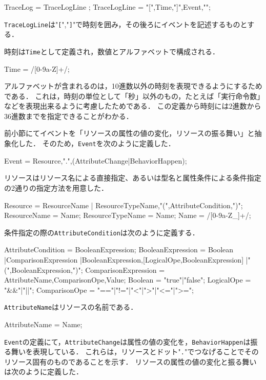 \begin{EBNF}
TraceLog = { TraceLogLine };
TraceLogLine = "[",Time,"]",Event,"\n";
\end{EBNF}

\verb|TraceLogLine|は"\verb|[|","\verb|]|"で時刻を囲み，その後ろにイベントを記述するものとする．

時刻は\verb|Time|として定義され，数値とアルファベットで構成される．

\begin{EBNF}
Time = /[0-9a-Z]+/;
\end{EBNF}

アルファベットが含まれるのは，10進数以外の時刻を表現できるようにするためである．
これは，時刻の単位として「秒」以外のもの，たとえば「実行命令数」などを表現出来るように考慮したためである．
この定義から時刻には2進数から36進数までを指定できることがわかる．

前小節にてイベントを「リソースの属性の値の変化，リソースの振る舞い」と抽象化した．
そのため，\verb|Event|を次のように定義した．

\begin{EBNF}
Event = Resource,".",(AttributeChange|BehaviorHappen);
\end{EBNF}

リソースはリソース名による直接指定、あるいは型名と属性条件による条件指定の2通りの指定方法を用意した．

\begin{EBNF}
Resource = ResourceName
         | ResourceTypeName,"(",AttributeCondition,")";
ResourceName = Name;
ResourceTypeName = Name;
Name = /[0-9a-Z_]+/;
\end{EBNF}

条件指定の際の\verb|AttributeCondition|は次のように定義する．

\begin{EBNF}
AttributeCondition = BooleanExpression;
BooleanExpression = Boolean
   |ComparisonExpression
   |BooleanExpression,[{LogicalOpe,BooleanExpression}]
   |"(",BooleanExpression,")";
ComparisonExpression = AttributeName,ComparisonOpe,Value;
Boolean = "true"|"false";
LogicalOpe = "&&"|"||";
ComparisonOpe = "=="|"!="|"<"|">"|"<="|">=";
\end{EBNF}

{\tt AttributeName}はリソースの名前である．

\begin{EBNF}
AttributeName = Name;
\end{EBNF}

{\tt Event}の定義にて，\verb|AttributeChange|は属性の値の変化を，\verb|BehaviorHappen|は振る舞いを表現している．
これらは，リソースとドット"\verb|.|"でつなげることでそのリソース固有のものであることを示す．
リソースの属性の値の変化と振る舞いは次のように定義した．

